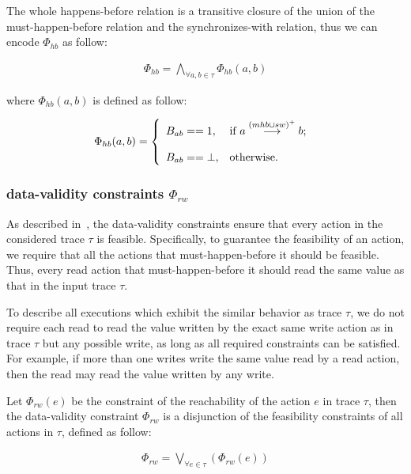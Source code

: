 \documentclass[preprint, numbers, 10pt]{sigplanconf}
\begin{document}
The whole happens-before relation is a transitive closure of the union of the must-happen-before relation
and the synchronizes-with relation, thus we can encode $\Phi_{hb}$ as follow: 

\begin{equation}
\begin{aligned}
\Phi_{hb} = \bigwedge_{\forall a,b\in \tau} \Phi_{hb}(a,b)
\end{aligned}
\end{equation}

where $\Phi_{hb}(a,b)$ is defined as follow: 

\[ \Phi_{hb}(a,b) = \left\{
  \begin{array}{l l}
    B_{ab}==1,           &  {\text{if $a \stackrel{(mhb\cup sw)^+}{\longrightarrow} b$; }}\\\\
    B_{ab}==\bot,  &  \text{otherwise}.
  \end{array} \right.\]

\subsubsection{data-validity constraints $\Phi_{rw}$}

As described in~\cite{Huang:2015}, the data-validity constraints
ensure that every action in the considered trace $\tau$ is feasible. 
Specifically, to guarantee the feasibility of an action, we require that
all the actions that must-happen-before it should be feasible. Thus,
every read action that must-happen-before it should read the same value
as that in the input trace $\tau$.  

To describe all executions which exhibit the similar behavior as trace $\tau$, 
we do not require each read to read the value written by the exact same write action
as in trace $\tau$ but any possible write, as long as all required constraints
can be satisfied. For example, if more than one writes write the same value read
by a read action, then the read may read the value written by any write.  

Let $\Phi_{rw}(e)$ be the constraint of the reachability of the action $e$ in trace $\tau$,
then the data-validity constraint $\Phi_{rw}$
is a disjunction of the feasibility constraints of all actions in $\tau$, defined as follow:

\begin{equation}
\begin{aligned}
\Phi_{rw} = \bigvee_{\forall e\in \tau} (\Phi_{rw}(e))
\end{aligned}
\end{equation} 
\end{document}
